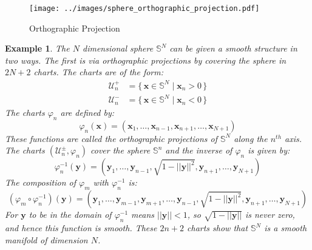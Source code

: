 \documentclass{article}
\theoremstyle{plain}
\theoremstyle{normal}
\newtheorem{example}{Example}[section]
\begin{document}
        \begin{figure}
            \centering
            \texttt{[image: ../images/sphere\_orthographic\_projection.pdf]}
            \caption{Orthographic Projection}
            \label{fig:sphere_orthographic_projection}
        \end{figure}
        \begin{example}
            The $N$ dimensional sphere $\mathbb{S}^{N}$ can be given a smooth
            structure in two ways. The first is via
            \textit{orthographic projections} by covering the sphere in
            $2N+2$ charts. The charts are of the form:
            \begin{align}
                \mathcal{U}_{n}^{+}&=
                    \{\,\mathbf{x}\in\mathbb{S}^{N}\;|\;
                        \mathbf{x}_{n}>0\,\}\\
                \mathcal{U}_{n}^{-}&=
                    \{\,\mathbf{x}\in\mathbb{S}^{N}\;|\;
                        \mathbf{x}_{n}<0\,\}
            \end{align}
            The charts $\varphi_{n}$ are defined by:
            \begin{equation}
                \varphi_{n}(\mathbf{x})
                    =(\mathbf{x}_{1},\dots,\mathbf{x}_{n-1},\mathbf{x}_{n+1},
                    \dots,\mathbf{x}_{N+1})
            \end{equation}
            These functions are called the \textit{orthographic projections}
            of $\mathbb{S}^{N}$ along the $n^{th}$ axis. The charts
            $(\mathcal{U}_{n}^{\pm},\varphi_{n})$ cover the sphere
            $\mathbb{S}^{n}$ and the inverse of
            $\varphi_{n}$ is given by:
            \begin{equation}
                \varphi_{n}^{-1}(\mathbf{y})
                    =(\mathbf{y}_{1},\dots,\mathbf{y}_{n-1},
                    \sqrt{1-||\mathbf{y}||^{2}},
                    \mathbf{y}_{n+1},\dots,\mathbf{y}_{N+1})
            \end{equation}
            The composition of $\varphi_{m}$ with $\varphi_{n}^{-1}$ is:
            \begin{equation}
                (\varphi_{m}\circ\varphi_{n}^{-1})(\mathbf{y})
                    =(\mathbf{y}_{1},\dots,\mathbf{y}_{m-1},\mathbf{y}_{m+1},
                    \dots,\mathbf{y}_{n-1},\sqrt{1-||\mathbf{y}||^{2}},
                    \mathbf{y}_{n+1},\dots,\mathbf{y}_{N+1})
            \end{equation}
            For $\mathbf{y}$ to be in the domain of $\varphi_{n}^{-1}$ means
            $||\mathbf{y}||<1$, so $\sqrt{1-||\mathbf{y}||}$ is never zero, and
            hence this function is smooth. These $2n+2$ charts show that
            $\mathbb{S}^{N}$ is a smooth manifold of dimension $N$.
        \end{example}
\end{document}
